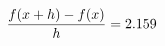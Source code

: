 \documentclass[preview]{standalone}
\begin{document}
\begin{align*}
\special{dvisvgm:raw <g id='unique000'>}\frac{f(x+h)-f(x)}{h} = 2.159\special{dvisvgm:raw </g>}
\end{align*}
\end{document}
